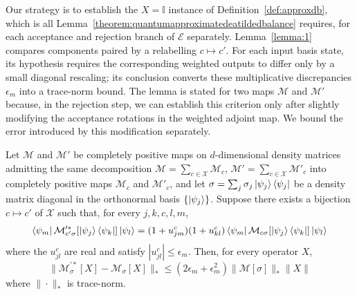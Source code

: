 Our strategy is to establish the $X=\mathbb{I}$ instance of Definition~\ref{def:approxdb}, which is all Lemma~\ref{theorem:quantumapproximatedeatildedbalance} requires, for each acceptance and rejection branch of $\mathcal{E}$ separately. Lemma~\ref{lemma:1} compares components paired by a relabelling $c\mapsto c'$. For each input basis state, its hypothesis requires the corresponding weighted outputs to differ only by a small diagonal rescaling; its conclusion converts these multiplicative discrepancies $\epsilon_{m}$ into a trace-norm bound. The lemma is stated for two maps $\mathcal{M}$ and $\mathcal{M}'$ because, in the rejection step, we can establish this criterion only after slightly modifying the acceptance rotations in the weighted adjoint map. We bound the error introduced by this modification separately.

\begin{lemma}
\label{lemma:1}
Let $\mathcal{M}$ and $\mathcal{M'}$ be completely positive maps on $d$-dimensional density matrices admitting the same decomposition $\mathcal{M} = \sum_{c\in\mathcal{X}} \mathcal{M}_c$, $\mathcal{M'} = \sum_{c\in\mathcal{X}} \mathcal{M'}_c$ into completely positive maps $\mathcal{M}_c$ and $\mathcal{M}'_c$, and let $\sigma = \sum_j \sigma_j \ket{\psi_j}\bra{\psi_j}$ be a density matrix diagonal in the orthonormal basis $\{\ket{\psi_j}\}$. Suppose there exists a bijection $c \mapsto c'$ of $\mathcal{X}$ such that, for every $j,k,c,l,m$,
\begin{equation}
    \bra{\psi_m}\mathcal{M}^{\prime *}_{c'\sigma}[\ket{\psi_j}\bra{\psi_k}]\ket{\psi_l}
    =(1+u^{c}_{jm})(1+ u^{c}_{kl})
    \bra{\psi_m}\mathcal{M}_{c\sigma}[\ket{\psi_j}\bra{\psi_k}]\ket{\psi_l}
    \label{eq:approximate_quantum_detailed_balance_condition}
\end{equation}
where the $u^{c}_{jl}$ are real and satisfy $|u^{c}_{jl}| \leq \epsilon_m$. Then, for every operator $X$,
 \begin{equation}
    \|\mathcal{M}^{\prime *}_{\sigma}[X]-\mathcal{M}_{\sigma}[X] \|_* \leq (2\epsilon_m+\epsilon_m^2)\|\mathcal{M}[\sigma]\|_*\|X\| \label{eq:lemma2output}
\end{equation}
where $\|\cdot\|_*$ is trace-norm.
\end{lemma}

